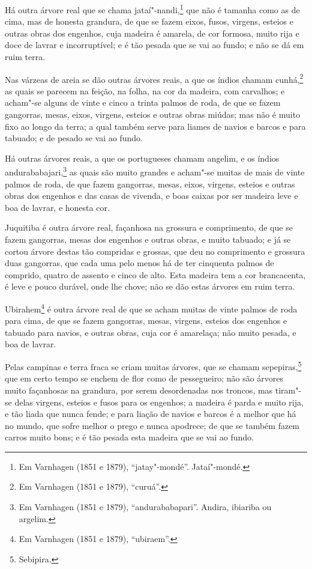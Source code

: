 Há outra árvore real que se chama jataí"-nandi,\footnote{ Em Varnhagen (1851 e 1879),
``jatay"-mondé''. Jataí"-mondé.} que não é tamanha como as de cima, mas de honesta grandura,
de que se fazem eixos, fusos, virgens, esteios e outras obras dos engenhos, cuja madeira é
amarela, de cor formosa, muito rija e doce de lavrar e incorruptível; e é tão pesada que
se vai ao fundo; e não se dá em ruim terra.

Nas várzeas de areia se dão outras árvores reais, a que os índios chamam cunhá,\footnote{
Em Varnhagen (1851 e 1879), ``curuá''.} as quais se parecem na feição, na folha, na cor da
madeira, com carvalhos; e acham"-se alguns de vinte e cinco a trinta palmos de roda, de que
se fazem gangorras, mesas, eixos, virgens, esteios e outras obras miúdas; mas não é muito
fixo ao longo da terra; a qual também serve para liames de navios e barcos e para tabuado;
e de pesado se vai ao fundo.

Há outras árvores reais, a que os portugueses chamam angelim, e os índios
andurababajari,\footnote{ Em Varnhagen (1851 e 1879), ``andurababapari''. Andira, ibiariba
ou argelim.} as quais são muito grandes e acham"-se muitas de mais de vinte palmos de roda,
de que fazem gangorras, mesas, eixos, virgens, esteios e outras obras dos engenhos e das
casas de vivenda, e boas caixas por ser madeira leve e boa de lavrar, e honesta cor.

Juquitiba é outra árvore real, façanhosa na grossura e comprimento, de que se fazem
gangorras, mesas dos engenhos e outras obras, e muito tabuado; e já se cortou árvore
destas tão compridas e grossas, que deu no comprimento e grossura duas gangorras, que cada
uma pelo menos há de ter cinquenta palmos de comprido, quatro de assento e cinco de alto.
Esta madeira tem a cor brancacenta, é leve e pouco durável, onde lhe chove; não se dão
estas árvores em ruim terra.

Ubirahem\footnote{ Em Varnhagen (1851 e 1879), ``ubiraem''.} é outra árvore real de que se
acham muitas de vinte palmos de roda para cima, de que se fazem gangorras, mesas, virgens,
esteios dos engenhos e tabuado para navios, e outras obras, cuja cor é amarelaça; não
muito pesada, e boa de lavrar.

Pelas campinas e terra fraca se criam muitas árvores, que se chamam sepepiras,\footnote{
Sebipira.} que em certo tempo se enchem de flor como de pessegueiro; não são árvores muito
façanhosas na grandura, por serem desordenadas nos troncos, mas tiram"-se delas virgens,
esteios e fusos para os engenhos; a madeira é parda e muito rija, e tão liada que nunca
fende; e para liação de navios e barcos é a melhor que há no mundo, que sofre melhor o
prego e nunca apodrece; de que se também fazem carros muito bons; e é tão pesada esta
madeira que se vai ao fundo.

